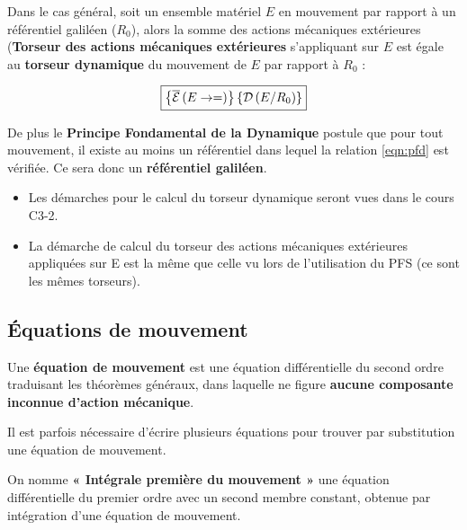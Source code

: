 \documentclass[10pt,fleqn]{article} %
\begin{document}
\begin{definition}
Dans le cas général, soit un ensemble matériel $E$ en mouvement par rapport à un référentiel galiléen ($R_0$), alors la somme des actions mécaniques extérieures (\textbf{Torseur des actions mécaniques extérieures} s'appliquant sur $E$ est égale au \textbf{torseur dynamique} du mouvement de $E$ par rapport à $R_0$ :

\begin{align}\label{eqn:pfd}
\boxed{
\left\{\mathcal{\overline{E}} \left(E\rightarrow = \right) \right\}\left\{\mathcal{D} \left(E/R_0 \right) \right\}
}
\end{align}

De plus le \textbf{Principe Fondamental de la Dynamique} postule que pour tout mouvement, il existe au moins un référentiel dans lequel la relation \ref{eqn:pfd} est vérifiée. Ce sera donc un \textbf{référentiel galiléen}.

\end{definition}

\begin{rem}
\begin{itemize}
\item Les démarches pour le calcul du torseur dynamique seront vues dans le cours C3-2.
\item La démarche de calcul du torseur des actions mécaniques extérieures appliquées sur E est la  même que celle vu lors de l'utilisation du PFS (ce sont les mêmes torseurs). 
\end{itemize}
\end{rem}

\subsection{Équations de mouvement}

\begin{definition}
Une \textbf{équation de mouvement} est une équation différentielle du second ordre traduisant les théorèmes généraux, dans laquelle ne figure \textbf{aucune composante inconnue d'action mécanique}. 

Il est parfois nécessaire d'écrire plusieurs équations pour trouver par substitution une équation de mouvement. 

On nomme \textbf{« Intégrale première du mouvement »} une équation différentielle du premier ordre avec un second membre constant, obtenue par  intégration d'une équation de mouvement. 
\end{definition}
\end{document}
